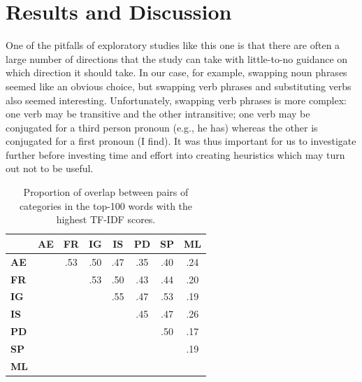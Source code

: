 \documentclass[letterpaper, 12 pt, conference]{ieeeconf}
\begin{document}
\section{Results and Discussion}
One of the pitfalls of exploratory studies like this one is that there are often a large number of directions that the study can take with little-to-no guidance on which direction it should take. In our case, for example, swapping noun phrases seemed like an obvious choice, but swapping verb phrases and substituting verbs also seemed interesting. Unfortunately, swapping verb phrases is more complex: one verb may be transitive and the other intransitive; one verb may be conjugated for a third person pronoun (e.g., he has) whereas the other is conjugated for a first pronoun (I find). It was thus important for us to investigate further before investing time and effort into creating heuristics which may turn out not to be useful.
\begin{table}[tp!]
    \centering
    \begin{tabular}{lccccccc}
        \toprule
            &
            \multicolumn{1}{c}{\textbf{AE}} & \multicolumn{1}{c}{\textbf{FR}} & \multicolumn{1}{c}{\textbf{IG}} & \multicolumn{1}{c}{\textbf{IS}} & \multicolumn{1}{c}{\textbf{PD}} & \multicolumn{1}{c}{\textbf{SP}} & \multicolumn{1}{c}{\textbf{ML}} \\
        \midrule
            \textbf{AE} & & .53 & .50 & .47 & .35 & .40 & .24 \\
            \textbf{FR} & &     & .53 & .50 & .43 & .44 & .20 \\
            \textbf{IG} & &     &     & .55 & .47 & .53 & .19 \\
            \textbf{IS} & &     &     &     & .45 & .47 & .26 \\ 
            \textbf{PD} & &     &     &     &     & .50 & .17 \\ 
            \textbf{SP} & &     &     &     &     &     & .19 \\ 
            \textbf{ML} & &     &     &     &     &     &     \\ 
        \bottomrule
    \end{tabular}
    \caption{Proportion of overlap between pairs of categories in the top-100 words with the highest TF-IDF scores.}
    \label{table:over-tfidf}
\end{table}
\end{document}
